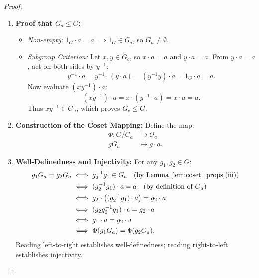 \begin{proof}
\begin{enumerate}[label=\arabic*., leftmargin=*]
    \item \textbf{Proof that $G_a \le G$:}
    \begin{itemize}[leftmargin=1.5em, itemsep=4pt]
        \item \emph{Non-empty:} $1_G \cdot a = a \implies 1_G \in G_a$, so $G_a \ne \emptyset$.
        \item \emph{Subgroup Criterion:} Let $x, y \in G_a$, so $x \cdot a = a$ and $y \cdot a = a$.
        From $y \cdot a = a$, act on both sides by $y^{-1}$:
        \begin{equation*}
        y^{-1} \cdot a = y^{-1} \cdot (y \cdot a) = (y^{-1} y) \cdot a = 1_G \cdot a = a.
        \end{equation*}
        Now evaluate $(xy^{-1}) \cdot a$:
        \begin{equation*}
        (xy^{-1}) \cdot a = x \cdot (y^{-1} \cdot a) = x \cdot a = a.
        \end{equation*}
        Thus $xy^{-1} \in G_a$, which proves $G_a \le G$.
    \end{itemize}

    \item \textbf{Construction of the Coset Mapping:}
    Define the map:
    \begin{align*}
    \Phi: G/G_a &\longrightarrow \mathcal{O}_a \\
    g G_a &\longmapsto g \cdot a.
    \end{align*}

    \item \textbf{Well-Definedness and Injectivity:}
    For any $g_1, g_2 \in G$:
    \begin{align*}
    g_1 G_a = g_2 G_a 
    &\iff g_2^{-1}g_1 \in G_a \quad \text{(by Lemma~\ref{lem:coset_props}(iii))} \\
    &\iff (g_2^{-1}g_1) \cdot a = a \quad \text{(by definition of $G_a$)} \\
    &\iff g_2 \cdot \bigl((g_2^{-1}g_1) \cdot a\bigr) = g_2 \cdot a \\
    &\iff (g_2 g_2^{-1} g_1) \cdot a = g_2 \cdot a \\
    &\iff g_1 \cdot a = g_2 \cdot a \\
    &\iff \Phi(g_1 G_a) = \Phi(g_2 G_a).
    \end{align*}
    Reading left-to-right establishes well-definedness; reading right-to-left establishes injectivity.


\end{enumerate}
\end{proof}
